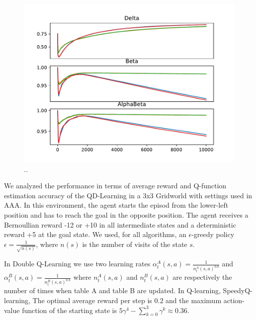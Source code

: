 \documentclass[conference]{IEEEtran}
\begin{document}
 \begin{figure}[t]
  \begin{minipage}{\columnwidth}
  \centering
   \includegraphics[width=\textwidth]{./imgs/gridHasselt/lrs.pdf}
  \end{minipage}
   \caption{..}
   \label{F:hasselt_all}
 \end{figure}
We analyzed the performance in terms of average reward and Q-function estimation accuracy of the QD-Learning in a $3$x$3$ Gridworld with settings used in AAA. In this environment, the agent starts the episod from the lower-left position and has to reach the goal in the opposite position. The agent receives a Bernoullian reward -12 or +10 in all intermediate states and a deterministic reward +5 at the goal state. We used, for all algorithms, an	$\epsilon$-greedy policy $\epsilon = \frac{1}{\sqrt{n(s)}}$, where $n(s)$ is the number of  visits of the state $s$.


In Double Q-Learning we use two learning rates $\alpha_t^A(s, a) = \frac{1}{n_t^A(s, a)^{0.8}}$ and $\alpha_t^B(s, a) = \frac{1}{n_t^B(s, a)^{0.8}}$ where $n_t^A(s, a)$ and $n_t^B(s, a)$ are respectively the number of times when table A and table B are updated. In Q-learning, SpeedyQ-learning, 
The optimal average reward per step is $0.2$ and the maximum action-value function of the starting state is $5\gamma^4 - \sum_{k=0}^3 \gamma^k \approx 0.36$.
\end{document}
